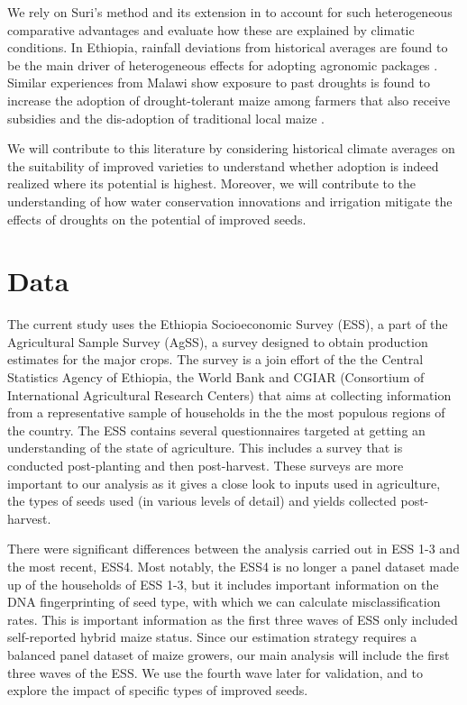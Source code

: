 \documentclass{article}
\begin{document}
We rely on Suri’s method and its extension in \citep{Tjernstrom_Emilia_Dalia_Ghanem_Oscar_Barriga_Cabanillas_Travis_J_Lybbert_Jeffrey_D_Michler_and_Aleksandr_Michuda2020-bc} to account for such heterogeneous comparative advantages and evaluate how these are explained by climatic conditions. In Ethiopia, rainfall deviations from historical averages are found to be the main driver of heterogeneous effects for adopting agronomic packages \citep{Marenya2020-kb}. Similar experiences from Malawi show exposure to past droughts is found to increase the adoption of drought-tolerant maize among farmers that also receive subsidies \citep{Katengeza2019-af} and the dis-adoption of traditional local maize \citep{Holden2016-vy}.

We will contribute to this literature by considering historical climate averages on the suitability of improved varieties to understand whether adoption is indeed realized where its potential is highest. Moreover, we will contribute to the understanding of how water conservation innovations and irrigation mitigate the effects of droughts on the potential of improved seeds.



\section{Data}

The current study uses the Ethiopia Socioeconomic Survey (ESS), a part of the Agricultural Sample Survey (AgSS), a survey designed to obtain production estimates for the major crops. The survey is a join effort of the the Central Statistics Agency of Ethiopia, the World Bank and CGIAR (Consortium of International Agricultural Research Centers) \citep{kosmowski2020shining} that aims at collecting information from a representative sample of households in the  the most populous regions of the country. The ESS contains several questionnaires targeted at getting an understanding of the state of agriculture. This includes a survey that is conducted post-planting and then post-harvest. These surveys are more important to our analysis as it gives a close look to inputs used in agriculture, the types of seeds used (in various levels of detail) and yields collected post-harvest.

There were significant differences between the analysis carried out in ESS 1-3 and the most recent, ESS4. Most notably, the ESS4 is no longer a panel dataset made up of the households of ESS 1-3, but it includes important information on the DNA fingerprinting of seed type, with which we can calculate misclassification rates. This is important information as the first three waves of ESS only included self-reported hybrid maize status. Since our estimation strategy requires a balanced panel dataset of maize growers, our main analysis will include the first three waves of the ESS. We use the fourth wave later for validation, and to explore the impact of specific types of improved seeds.
\end{document}
